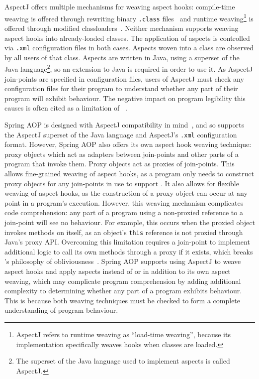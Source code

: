 AspectJ offers multiple mechanisms for weaving aspect hooks: compile-time
weaving is offered through rewriting binary \lstinline{.class}
files~\cite{aspectj-bytecode-weaving-documentation} and runtime
weaving\footnote{AspectJ refers to runtime weaving as ``load-time weaving'',
because its implementation specifically weaves hooks when classes are loaded.}
is offered through modified classloaders~\cite{aspectj_ltw_docs}. Neither
mechanism supports weaving aspect hooks into already-loaded classes. The
application of aspects is controlled via \lstinline{.xml} configuration files in
both cases. Aspects woven into a class are observed by all users of that class.
Aspects are written in Java, using a superset of the Java language\footnote{The
superset of the Java language used to implement aspects is called AspectJ.}, so
an extension to Java is required in order to use it. As AspectJ join-points are
specified in configuration files, users of AspectJ must check any configuration
files for their program to understand whether any part of their program will
exhibit \aspectoriented behaviour. The negative impact on program legibility
this causes is often cited as a limitation of
\aop{}~\cite{Constantinides04aopconsidered,steimann06paradoxical,przybylek2010wrong,przybylek2018empirical}.

Spring AOP is designed with AspectJ compatibility in
mind~\cite{introducing_spring_aop_chapter_integration_with_aspectj}, and so
supports the AspectJ superset of the Java language and AspectJ's
\lstinline{.xml} configuration format. However, Spring AOP also offers its own
aspect hook weaving technique: proxy objects which act as adapters between
join-points and other parts of a program that invoke them. Proxy objects act as
proxies of join-points. This allows fine-grained weaving of aspect hooks, as a
program only needs to construct proxy objects for any join-points in use to
support \aop{}. It also allows for flexible weaving of aspect hooks, as the
construction of a proxy object can occur at any point in a program's execution.
However, this weaving mechanism complicates code comprehension: any part of a
program using a non-proxied reference to a join-point will see no
\aspectoriented behaviour. For example, this occurs when the proxied object
invokes methods on itself, as an object's \lstinline{this} reference is not
proxied through Java's proxy API. Overcoming this limitation requires a
join-point to implement additional logic to call its own methods through a proxy
if it exists, which breaks \aop{}'s philosophy of
obliviousness~\cite{filman2000aspect}. Spring AOP supports using AspectJ to
weave aspect hooks and apply aspects instead of or in addition to its own aspect
weaving, which may complicate program comprehension by adding additional
complexity to determining whether any part of a program exhibits \aspectoriented
behaviour. This is because both weaving techniques must be checked to form a complete
understanding of program behaviour. 

